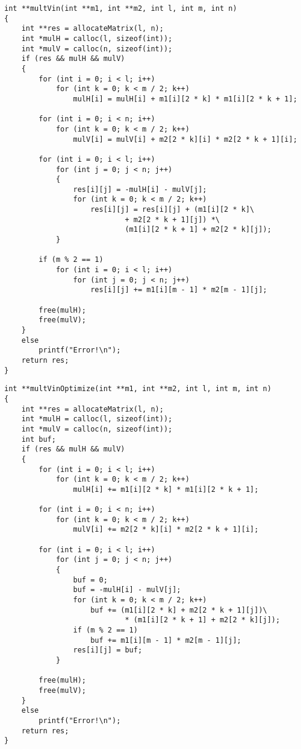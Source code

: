 \begin{lstlisting}[label=multVin, caption=Алгоритм умножения матриц Винограда]
int **multVin(int **m1, int **m2, int l, int m, int n)
{
    int **res = allocateMatrix(l, n);
    int *mulH = calloc(l, sizeof(int));
    int *mulV = calloc(n, sizeof(int));
    if (res && mulH && mulV)
    {
        for (int i = 0; i < l; i++)
            for (int k = 0; k < m / 2; k++)
                mulH[i] = mulH[i] + m1[i][2 * k] * m1[i][2 * k + 1];

        for (int i = 0; i < n; i++)
            for (int k = 0; k < m / 2; k++)
                mulV[i] = mulV[i] + m2[2 * k][i] * m2[2 * k + 1][i];

        for (int i = 0; i < l; i++)
            for (int j = 0; j < n; j++)
            {
                res[i][j] = -mulH[i] - mulV[j];
                for (int k = 0; k < m / 2; k++)
                    res[i][j] = res[i][j] + (m1[i][2 * k]\
                            + m2[2 * k + 1][j]) *\
                            (m1[i][2 * k + 1] + m2[2 * k][j]);
            }

        if (m % 2 == 1)
            for (int i = 0; i < l; i++)
                for (int j = 0; j < n; j++)
                    res[i][j] += m1[i][m - 1] * m2[m - 1][j];

        free(mulH);
        free(mulV);
    }
    else
        printf("Error!\n");
    return res;
}
\end{lstlisting}

\begin{lstlisting}[label=multVinOptimize, caption=Алгоритм умножения матриц Винограда (оптимизированный)]
int **multVinOptimize(int **m1, int **m2, int l, int m, int n)
{
    int **res = allocateMatrix(l, n);
    int *mulH = calloc(l, sizeof(int));
    int *mulV = calloc(n, sizeof(int));
    int buf;
    if (res && mulH && mulV)
    {
        for (int i = 0; i < l; i++)
            for (int k = 0; k < m / 2; k++)
                mulH[i] += m1[i][2 * k] * m1[i][2 * k + 1];

        for (int i = 0; i < n; i++)
            for (int k = 0; k < m / 2; k++)
                mulV[i] += m2[2 * k][i] * m2[2 * k + 1][i];

        for (int i = 0; i < l; i++)
            for (int j = 0; j < n; j++)
            {
                buf = 0;
                buf = -mulH[i] - mulV[j];
                for (int k = 0; k < m / 2; k++)
                    buf += (m1[i][2 * k] + m2[2 * k + 1][j])\
                            * (m1[i][2 * k + 1] + m2[2 * k][j]);
                if (m % 2 == 1)
                    buf += m1[i][m - 1] * m2[m - 1][j];
                res[i][j] = buf;
            }

        free(mulH);
        free(mulV);
    }
    else
        printf("Error!\n");
    return res;
}
\end{lstlisting}
\captionsetup{singlelinecheck = false, justification=centering}

